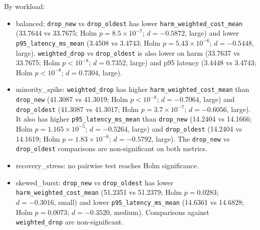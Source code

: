 By workload:
\begin{itemize}
  \item balanced:
  \texttt{drop\_new} vs \texttt{drop\_oldest} has lower
  \texttt{harm\_weighted\_cost\_mean} (33.7644 vs 33.7675; Holm \(p=8.5\times 10^{-7}\); \(d=-0.5872\), large)
  and lower \texttt{p95\_latency\_ms\_mean} (3.4508 vs 3.4743; Holm \(p=5.43\times 10^{-6}\); \(d=-0.5448\), large).
  \texttt{weighted\_drop} vs \texttt{drop\_oldest} is also lower on harm
  (33.7637 vs 33.7675; Holm \(p<10^{-8}\); \(d=0.7352\), large)
  and p95 latency (3.4448 vs 3.4743; Holm \(p<10^{-8}\); \(d=0.7304\), large).
  \item minority\_spike:
  \texttt{weighted\_drop} has higher \texttt{harm\_weighted\_cost\_mean} than \texttt{drop\_new}
  (41.3087 vs 41.3019; Holm \(p<10^{-8}\); \(d=-0.7064\), large)
  and \texttt{drop\_oldest} (41.3087 vs 41.3017; Holm \(p=3.7\times 10^{-7}\); \(d=-0.6056\), large).
  It also has higher \texttt{p95\_latency\_ms\_mean} than \texttt{drop\_new}
  (14.2404 vs 14.1666; Holm \(p=1.165\times 10^{-5}\); \(d=-0.5264\), large)
  and \texttt{drop\_oldest} (14.2404 vs 14.1619; Holm \(p=1.83\times 10^{-6}\); \(d=-0.5792\), large).
  The \texttt{drop\_new} vs \texttt{drop\_oldest} comparisons are non-significant on both metrics.
  \item recovery\_stress: no pairwise test reaches Holm significance.
  \item skewed\_burst:
  \texttt{drop\_new} vs \texttt{drop\_oldest} has lower
  \texttt{harm\_weighted\_cost\_mean} (51.2351 vs 51.2379; Holm \(p=0.0283\); \(d=-0.3016\), small)
  and lower \texttt{p95\_latency\_ms\_mean} (14.6361 vs 14.6828; Holm \(p=0.0073\); \(d=-0.3520\), medium).
  Comparisons against \texttt{weighted\_drop} are non-significant.
\end{itemize}
